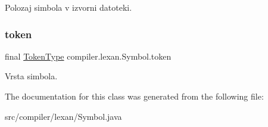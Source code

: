 Polozaj simbola v izvorni datoteki. \mbox{\label{classcompiler_1_1lexan_1_1_symbol_a587ed95f776d43eb968a46f3eb128e1e}} 
\subsubsection{\texorpdfstring{token}{token}}
{\footnotesize\ttfamily final \hyperlink{enumcompiler_1_1lexan_1_1_token_type}{Token\+Type} compiler.\+lexan.\+Symbol.\+token}

Vrsta simbola. 

The documentation for this class was generated from the following file\+:\begin{DoxyCompactItemize}
\item 
src/compiler/lexan/Symbol.\+java\end{DoxyCompactItemize}
